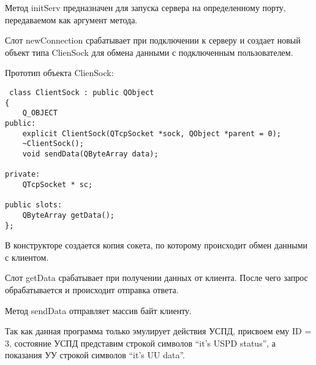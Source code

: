 Метод initServ предназначен для запуска сервера на определенному порту, передаваемом как аргумент метода.

Слот newConnection срабатывает при подключении к серверу и создает новый объект типа ClienSock для обмена данными с подключенным пользователем.

Прототип объекта ClienSock:

\begin{lstlisting}
 class ClientSock : public QObject
{
    Q_OBJECT
public:
    explicit ClientSock(QTcpSocket *sock, QObject *parent = 0);
    ~ClientSock();
    void sendData(QByteArray data);
    
private:
    QTcpSocket * sc;

public slots:
    QByteArray getData();
};
\end{lstlisting}

В конструкторе создается копия сокета, по которому происходит обмен данными с клиентом.

Слот getData срабатывает при получении данных от клиента. После чего запрос обрабатывается и происходит отправка ответа.

Метод sendData отправляет массив байт клиенту.

Так как данная программа только эмулирует действия УСПД, присвоем ему ID = 3, состояние УСПД представим строкой символов ``it's USPD status'', а показания УУ строкой символов ``it's UU data''.

